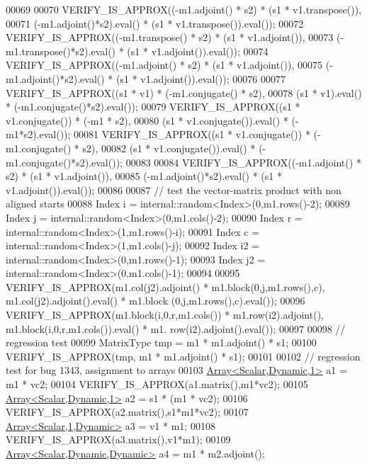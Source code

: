 \begin{DoxyCode}
00069 
00070   VERIFY\_IS\_APPROX((-m1.adjoint() * s2) * (s1 * v1.transpose()),
00071                    (-m1.adjoint()*s2).eval() * (s1 * v1.transpose()).eval());
00072   VERIFY\_IS\_APPROX((-m1.transpose() * s2) * (s1 * v1.adjoint()),
00073                    (-m1.transpose()*s2).eval() * (s1 * v1.adjoint()).eval());
00074   VERIFY\_IS\_APPROX((-m1.adjoint() * s2) * (s1 * v1.adjoint()),
00075                    (-m1.adjoint()*s2).eval() * (s1 * v1.adjoint()).eval());
00076 
00077   VERIFY\_IS\_APPROX((s1 * v1) * (-m1.conjugate() * s2),
00078                    (s1 * v1).eval() * (-m1.conjugate()*s2).eval());
00079   VERIFY\_IS\_APPROX((s1 * v1.conjugate()) * (-m1 * s2),
00080                    (s1 * v1.conjugate()).eval() * (-m1*s2).eval());
00081   VERIFY\_IS\_APPROX((s1 * v1.conjugate()) * (-m1.conjugate() * s2),
00082                    (s1 * v1.conjugate()).eval() * (-m1.conjugate()*s2).eval());
00083 
00084   VERIFY\_IS\_APPROX((-m1.adjoint() * s2) * (s1 * v1.adjoint()),
00085                    (-m1.adjoint()*s2).eval() * (s1 * v1.adjoint()).eval());
00086 
00087   \textcolor{comment}{// test the vector-matrix product with non aligned starts}
00088   Index i = internal::random<Index>(0,m1.rows()-2);
00089   Index j = internal::random<Index>(0,m1.cols()-2);
00090   Index r = internal::random<Index>(1,m1.rows()-i);
00091   Index c = internal::random<Index>(1,m1.cols()-j);
00092   Index i2 = internal::random<Index>(0,m1.rows()-1);
00093   Index j2 = internal::random<Index>(0,m1.cols()-1);
00094 
00095   VERIFY\_IS\_APPROX(m1.col(j2).adjoint() * m1.block(0,j,m1.rows(),c), m1.col(j2).adjoint().eval() * m1.block
      (0,j,m1.rows(),c).eval());
00096   VERIFY\_IS\_APPROX(m1.block(i,0,r,m1.cols()) * m1.row(i2).adjoint(), m1.block(i,0,r,m1.cols()).eval() * m1.
      row(i2).adjoint().eval());
00097   
00098   \textcolor{comment}{// regression test}
00099   MatrixType tmp = m1 * m1.adjoint() * s1;
00100   VERIFY\_IS\_APPROX(tmp, m1 * m1.adjoint() * s1);
00101 
00102   \textcolor{comment}{// regression test for bug 1343, assignment to arrays}
00103   \hyperlink{group___core___module_class_eigen_1_1_array}{Array<Scalar,Dynamic,1>} a1 = m1 * vc2;
00104   VERIFY\_IS\_APPROX(a1.matrix(),m1*vc2);
00105   \hyperlink{group___core___module_class_eigen_1_1_array}{Array<Scalar,Dynamic,1>} a2 = s1 * (m1 * vc2);
00106   VERIFY\_IS\_APPROX(a2.matrix(),s1*m1*vc2);
00107   \hyperlink{group___core___module_class_eigen_1_1_array}{Array<Scalar,1,Dynamic>} a3 = v1 * m1;
00108   VERIFY\_IS\_APPROX(a3.matrix(),v1*m1);
00109   \hyperlink{group___core___module_class_eigen_1_1_array}{Array<Scalar,Dynamic,Dynamic>} a4 = m1 * m2.adjoint();

\end{DoxyCode}
